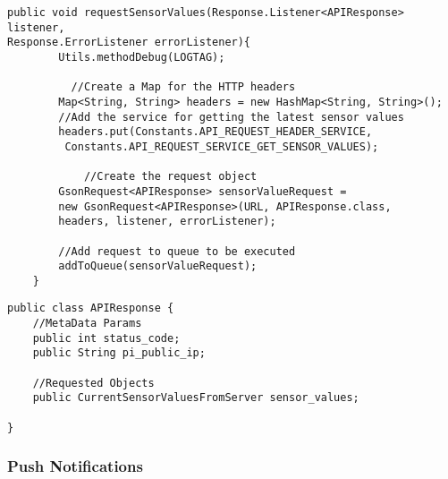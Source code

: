 \documentclass{article}
\begin{document}
\begin{lstlisting}[caption={Java method API call for request latest sensor readings},label={lst:java_api_call}]
public void requestSensorValues(Response.Listener<APIResponse> listener,
Response.ErrorListener errorListener){
        Utils.methodDebug(LOGTAG);

	      //Create a Map for the HTTP headers
        Map<String, String> headers = new HashMap<String, String>();
        //Add the service for getting the latest sensor values
        headers.put(Constants.API_REQUEST_HEADER_SERVICE,
         Constants.API_REQUEST_SERVICE_GET_SENSOR_VALUES);

		    //Create the request object
        GsonRequest<APIResponse> sensorValueRequest = 
        new GsonRequest<APIResponse>(URL, APIResponse.class, 
        headers, listener, errorListener);
        
        //Add request to queue to be executed
        addToQueue(sensorValueRequest);
    }

\end{lstlisting}
\newpage

\begin{lstlisting}[caption={APIResponse class, used when parsing the RESTful API response},label={lst:java_api_response_obj}]
public class APIResponse {
    //MetaData Params
    public int status_code;
    public String pi_public_ip;

    //Requested Objects
    public CurrentSensorValuesFromServer sensor_values;

}
\end{lstlisting}		


\subsubsection{Push Notifications}
\label{sssec:android_push_notifications}



\begin{thebibliography}{fi99}

\end{thebibliography}
\end{document}
